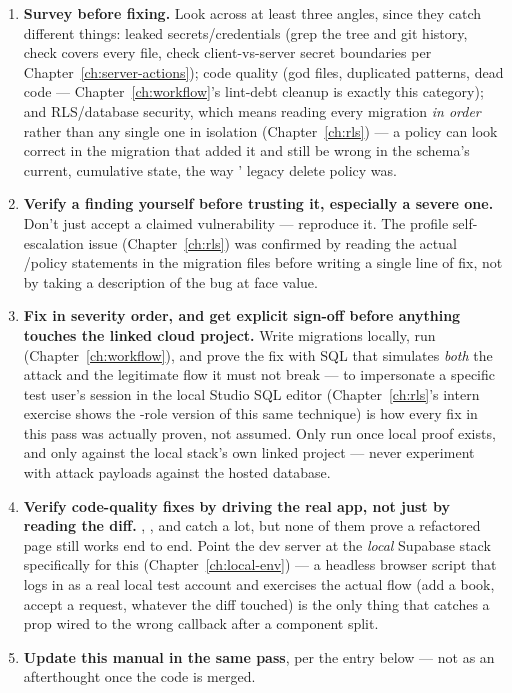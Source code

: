 \begin{enumerate}
  \item \textbf{Survey before fixing.} Look across at least three angles, since they catch different things: leaked secrets/credentials (grep the tree and git history, check  covers every  file, check client-vs-server secret boundaries per Chapter~\ref{ch:server-actions}); code quality (god files, duplicated patterns, dead code — Chapter~\ref{ch:workflow}'s lint-debt cleanup is exactly this category); and RLS/database security, which means reading every migration \emph{in order} rather than any single one in isolation (Chapter~\ref{ch:rls}) — a policy can look correct in the migration that added it and still be wrong in the schema's current, cumulative state, the way ' legacy delete policy was.
  \item \textbf{Verify a finding yourself before trusting it, especially a severe one.} Don't just accept a claimed vulnerability — reproduce it. The profile self-escalation issue (Chapter~\ref{ch:rls}) was confirmed by reading the actual /policy statements in the migration files before writing a single line of fix, not by taking a description of the bug at face value.
  \item \textbf{Fix in severity order, and get explicit sign-off before anything touches the linked cloud project.} Write migrations locally, run  (Chapter~\ref{ch:workflow}), and prove the fix with SQL that simulates \emph{both} the attack and the legitimate flow it must not break —  to impersonate a specific test user's session in the local Studio SQL editor (Chapter~\ref{ch:rls}'s intern exercise shows the -role version of this same technique) is how every fix in this pass was actually proven, not assumed. Only run  once local proof exists, and only against the local stack's own linked project — never experiment with attack payloads against the hosted database.
  \item \textbf{Verify code-quality fixes by driving the real app, not just by reading the diff.} , , and  catch a lot, but none of them prove a refactored page still works end to end. Point the dev server at the \emph{local} Supabase stack specifically for this (Chapter~\ref{ch:local-env}) — a headless browser script that logs in as a real local test account and exercises the actual flow (add a book, accept a request, whatever the diff touched) is the only thing that catches a prop wired to the wrong callback after a component split.
  \item \textbf{Update this manual in the same pass}, per the entry below — not as an afterthought once the code is merged.
\end{enumerate}

